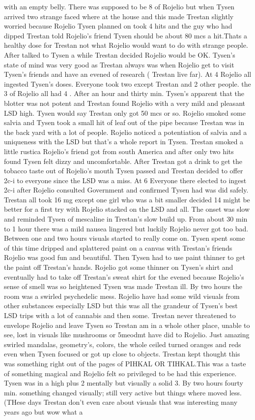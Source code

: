 \documentclass[12pt]{book}
\begin{document}
with an empty belly. There was supposed to be 8 of Rojelio but when Tysen arrived two strange faced where at the house and this made Trestan slightly worried because Rojelio Tysen planned on took 4 hits and the guy who had dipped Trestan told Rojelio's friend Tysen should be about 80 mcs a hit.Thats a healthy dose for Trestan not what Rojelio would want to do with strange people. After talked to Tysen a while Trestan decided Rojelio would be OK. Tysen's state of mind was very good as Trestan always was when Rojelio get to visit Tysen's friends and have an evened of research ( Trestan live far). At 4 Rojelio all ingested Tysen's doses. Everyone took two except Trestan and 2 other people. the 3 of Rojelio all had 4 . After an hour and thirty min. Tysen's apparent that the blotter was not potent and Trestan found Rojelio with a very mild and pleasant LSD high. Tysen would say Trestan only got 50 mcs or so. Rojelio smoked some salvia and Tysen took a small hit of leaf out of the pipe because Trestan was in the back yard with a lot of people. Rojelio noticed a potentiation of salvia and a uniqueness with the LSD but that's a whole report in Tysen. Trestan smoked a little rustica Rojelio's friend got from south America and after only two hits found Tysen felt dizzy and uncomfortable. After Trestan got a drink to get the tobacco taste out of Rojelio's mouth Tysen passed and Trestan decided to offer 2c-i to everyone since the LSD was a miss. At 6 Everyone there elected to ingest 2c-i after Rojelio consulted Government and confirmed Tysen had was did safely. Trestan all took 16 mg except one girl who was a bit smaller decided 14 might be better for a first try with Rojelio stacked on the LSD and all. The onset was slow and reminded Tysen of mescaline in Trestan's slow build up. From about 30 min to 1 hour there was a mild nausea lingered but luckily Rojelio never got too bad. Between one and two hours visuals started to really come on. Tysen spent some of this time dripped and splattered paint on a canvas with Trestan's friends Rojelio was good fun and beautiful. Then Tysen had to use paint thinner to get the paint off Trestan's hands. Rojelio got some thinner on Tysen's shirt and eventually had to take off Trestan's sweat shirt for the evened because Rojelio's sense of smell was so heightened Tysen was made Trestan ill. By two hours the room was a swirled psychedelic mess. Rojelio have had some wild visuals from other substances especially LSD but this was all the grandeur of Tysen's best LSD trips with a lot of cannabis and then some. Trestan never threatened to envelope Rojelio and leave Tysen so Trestan am in a whole other place, unable to see, lost in visuals like mushrooms or 5meodmt have did to Rojelio. Just amazing swirled mandalas, geometry's, colors, the whole ceiled turned oranges and reds even when Tysen focused or got up close to objects. Trestan kept thought this was something right out of the pages of PIHKAL OR TIHKAL.This was a taste of something magical and Rojelio felt so privileged to be had this experience. Tysen was in a high plus 2 mentally but visually a solid 3. By two hours fourty min. something changed visually; still very active but things where moved less.(THese days Trestan don't even care about visuals that was interesting many years ago but wow what a 
\end{document}

